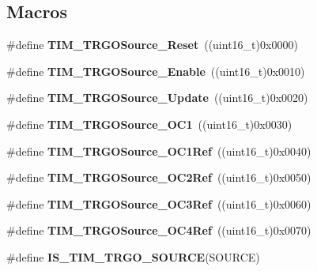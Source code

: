 \subsection*{Macros}
\begin{DoxyCompactItemize}
\item 
\mbox{\label{group___t_i_m___trigger___output___source_gafb039ed39279a4d1134b234797b1cdfb}} 
\#define {\bfseries T\+I\+M\+\_\+\+T\+R\+G\+O\+Source\+\_\+\+Reset}~((uint16\+\_\+t)0x0000)
\item 
\mbox{\label{group___t_i_m___trigger___output___source_gaa228ba6cfafcf676e33e3ee35cb7fc1c}} 
\#define {\bfseries T\+I\+M\+\_\+\+T\+R\+G\+O\+Source\+\_\+\+Enable}~((uint16\+\_\+t)0x0010)
\item 
\mbox{\label{group___t_i_m___trigger___output___source_ga8a73c717070ab1a0ef90326780f20aef}} 
\#define {\bfseries T\+I\+M\+\_\+\+T\+R\+G\+O\+Source\+\_\+\+Update}~((uint16\+\_\+t)0x0020)
\item 
\mbox{\label{group___t_i_m___trigger___output___source_ga2d044b472c021f5484b9f71eb9ca69f1}} 
\#define {\bfseries T\+I\+M\+\_\+\+T\+R\+G\+O\+Source\+\_\+\+O\+C1}~((uint16\+\_\+t)0x0030)
\item 
\mbox{\label{group___t_i_m___trigger___output___source_ga7cb70a2a026dc02136bdbb3dcc483d6c}} 
\#define {\bfseries T\+I\+M\+\_\+\+T\+R\+G\+O\+Source\+\_\+\+O\+C1\+Ref}~((uint16\+\_\+t)0x0040)
\item 
\mbox{\label{group___t_i_m___trigger___output___source_ga059f9f6cf96c833180eb3cdf5e56bd04}} 
\#define {\bfseries T\+I\+M\+\_\+\+T\+R\+G\+O\+Source\+\_\+\+O\+C2\+Ref}~((uint16\+\_\+t)0x0050)
\item 
\mbox{\label{group___t_i_m___trigger___output___source_ga40943bc1c3f22b983c683cbf0e87a218}} 
\#define {\bfseries T\+I\+M\+\_\+\+T\+R\+G\+O\+Source\+\_\+\+O\+C3\+Ref}~((uint16\+\_\+t)0x0060)
\item 
\mbox{\label{group___t_i_m___trigger___output___source_gafc81561599199912d613c65f760919bc}} 
\#define {\bfseries T\+I\+M\+\_\+\+T\+R\+G\+O\+Source\+\_\+\+O\+C4\+Ref}~((uint16\+\_\+t)0x0070)
\item 
\#define {\bfseries I\+S\+\_\+\+T\+I\+M\+\_\+\+T\+R\+G\+O\+\_\+\+S\+O\+U\+R\+CE}(S\+O\+U\+R\+CE)
\end{DoxyCompactItemize}


